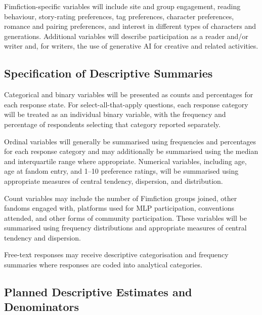 Fimfiction-specific variables will include site and group engagement, reading behaviour, story-rating preferences, tag preferences, character preferences, romance and pairing preferences, and interest in different types of characters and generations. Additional variables will describe participation as a reader and/or writer and, for writers, the use of generative AI for creative and related activities.


\subsection{Specification of Descriptive Summaries}

Categorical and binary variables will be presented as counts and percentages for each response state. For select-all-that-apply questions, each response category will be treated as an individual binary variable, with the frequency and percentage of respondents selecting that category reported separately.

Ordinal variables will generally be summarised using frequencies and percentages for each response category and may additionally be summarised using the median and interquartile range where appropriate. Numerical variables, including age, age at fandom entry, and 1--10 preference ratings, will be summarised using appropriate measures of central tendency, dispersion, and distribution.

Count variables may include the number of Fimfiction groups joined, other fandoms engaged with, platforms used for MLP participation, conventions attended, and other forms of community participation. These variables will be summarised using frequency distributions and appropriate measures of central tendency and dispersion.

Free-text responses may receive descriptive categorisation and frequency summaries where responses are coded into analytical categories.


\subsection{Planned Descriptive Estimates and Denominators}

